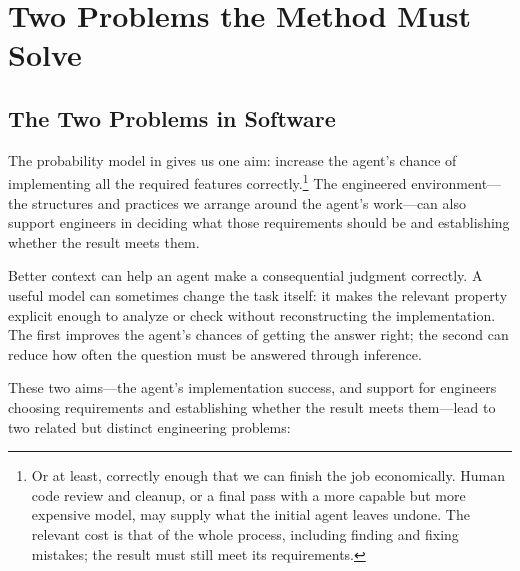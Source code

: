 


\chapter{Two Problems the Method Must Solve}

\section{The Two Problems in Software}\label{heading:the-two-problems-in-software}


The probability model in  gives us one aim: increase the agent’s chance of implementing all the required features correctly.\footnote{Or at least, correctly enough that we can finish the job economically. Human code review and cleanup, or a final pass with a more capable but more expensive model, may supply what the initial agent leaves undone. The relevant cost is that of the whole process, including finding and fixing mistakes; the result must still meet its requirements.} The engineered environment—the structures and practices we arrange around the agent’s work—can also support engineers in deciding what those requirements should be and establishing whether the result meets them.

Better context can help an agent make a consequential judgment correctly. A useful model can sometimes change the task itself: it makes the relevant property explicit enough to analyze or check without reconstructing the implementation. The first improves the agent’s chances of getting the answer right; the second can reduce how often the question must be answered through inference.

These two aims—the agent’s implementation success, and support for engineers choosing requirements and establishing whether the result meets them—lead to two related but distinct engineering problems:

